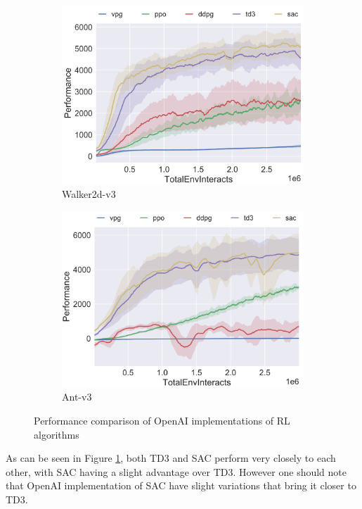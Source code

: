 \documentclass[12pt,twoside]{report}
\begin{document}
\begin{figure}[h]
\begin{subfigure}[b]{0.49\textwidth}
         \includegraphics[width=\textwidth]{figures/OpenAI benchmarks/walker pt.png}
         \caption{Walker2d-v3}
     \end{subfigure}
     \hfill
     \begin{subfigure}[b]{0.49\textwidth}
         \centering
         \includegraphics[width=\textwidth]{figures/OpenAI benchmarks/ant pt.png}
         \caption{Ant-v3}
     \end{subfigure}
        \caption{Performance comparison of OpenAI implementations of RL algorithms \cite{openai:bench}}
        \label{fig:openAI-comparisons}
\end{figure}

As can be seen in Figure \ref{fig:openAI-comparisons}, both TD3 and SAC perform very closely to each other, with SAC having a slight advantage over TD3. However one should note that OpenAI implementation of SAC have slight variations that bring it closer to TD3. \cite{openai:sac-code}
\end{document}
